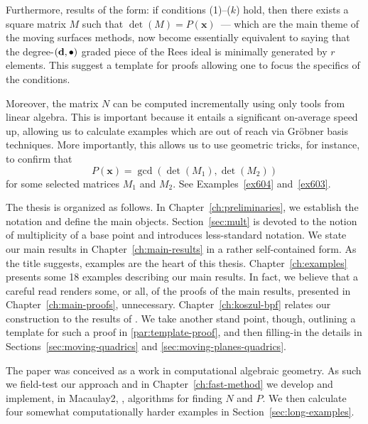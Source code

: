 \documentclass[fleqn,reqno]{amsart}
\begin{document}
Furthermore, results of the form:
if conditions (1)--($k$) hold,
then there exists a square matrix $M$ such that $\det(M)=P(\mathbf x)$~---
which are the main theme of the moving surfaces methods,
now become essentially equivalent to saying that the degree-$(\mathbf d,\bullet)$ graded piece
of the Rees ideal is minimally generated by $r$ elements.
This suggest a template for proofs allowing one to focus the specifics of the conditions.

Moreover, the matrix $N$ can be computed incrementally
using only tools from linear algebra.
This is important because it entails a significant on-average speed up,
allowing us to calculate examples which are out of reach via Gr\"obner basis techniques.
More importantly, this allows us to use geometric tricks, for instance,
to confirm that
\[
	P(\mathbf x)=\gcd(\det(M_1),\det(M_2))
\]
for some selected matrices $M_1$ and $M_2$.
See Examples~\ref{ex604} and~\ref{ex603}.

The thesis is organized as follows.
In Chapter~\ref{ch:preliminaries}, we establish the notation and define the main objects.
Section~\ref{sec:mult} is devoted to the notion of multiplicity of a base point and
introduces less-standard notation.
We state our main results in Chapter~\ref{ch:main-results} in a rather self-contained form.
As the title suggests, examples are the heart of this thesis.
Chapter~\ref{ch:examples} presents some 18 examples describing our main results.
In fact, we believe that a careful read renders some, or all, of the proofs of the main results,
presented in Chapter~\ref{ch:main-proofs}, unnecessary.
Chapter~\ref{ch:koszul-bpf} relates our construction to the results of \citet{CGZ-00}.
We take another stand point, though, outlining a template for such a proof in
\eqref{par:template-proof},
and then filling-in the details in
Sections~\ref{sec:moving-quadrics} and \ref{sec:moving-planes-quadrics}.

The paper was conceived as a work in computational algebraic geometry.
As such we field-test our approach and in Chapter~\ref{ch:fast-method}
we develop and implement, in Macaulay2, \citet{M2},
algorithms for finding $N$ and $P$.
We then calculate four somewhat computationally harder examples in Section~\ref{sec:long-examples}.



\end{document}
